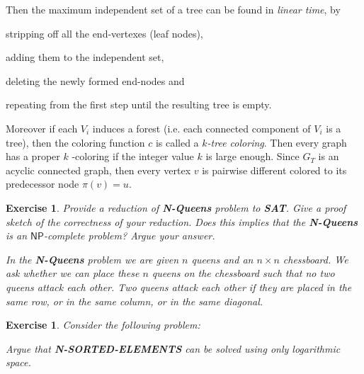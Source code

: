 \documentclass[11pt]{article}
\newtheorem{exercise}[theorem]{Exercise}
\begin{document}
Then the maximum independent set of a tree can be found in \textit{linear
time}, by%
\begin{inparaenum}[\itshape 1\upshape)]
\item stripping off all the end-vertexes (leaf nodes),
\item adding them to the independent set,
\item deleting the newly formed end-nodes and
\item repeating from the first step until the resulting tree is empty.
\end{inparaenum}
Moreover if each $V_{i}$ induces a forest (i.e. each
connected component of $V_{i}$ is a tree), then the coloring function $c$ is
called a $k$\textit{-tree coloring}. Then every graph has a proper $k$%
-coloring if the integer value $k$ is large enough. Since $G_{T}$ is an
acyclic connected graph, then every vertex $v$ is pairwise different colored
to its predecessor node $\pi (v)=u$.

\bigskip

\begin{exercise}
\label{ex:Nqueens} Provide a reduction of \textbf{N-Queens} problem to 
\textbf{SAT}. Give a proof sketch of the correctness of your reduction. Does
this implies that the \textbf{N-Queens} is an $\mathsf{NP}$-complete
problem? Argue your answer.

\smallskip

\noindent In the \textbf{N-Queens} problem we are given $n$ queens and an $n
\times n$ chessboard. We ask whether we can place these $n$ queens on the
chessboard such that no two queens attack each other. Two queens attack each
other if they are placed in the same row, or in the same column, or in the
same diagonal.
\end{exercise}

\begin{exercise}
Consider the following problem:


\medskip Argue that \textbf{N-SORTED-ELEMENTS} can be solved using only
logarithmic space.
\end{exercise}
\end{document}
